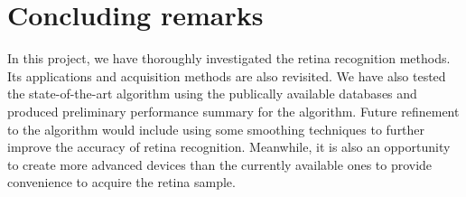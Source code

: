 \documentclass[a4paper,11pt]{article}
\theoremstyle{plain} %
\begin{document}
\section{Concluding remarks}
In this project, we have thoroughly investigated the retina recognition methods. Its applications and acquisition methods are also revisited. We have also tested the state-of-the-art algorithm using the publically available databases and produced preliminary performance summary for the algorithm. Future refinement to the algorithm would include using some smoothing techniques  to further improve the accuracy of retina recognition. Meanwhile, it is also an opportunity to create more advanced devices than the currently available ones to provide convenience to acquire the retina sample.




\end{document}
